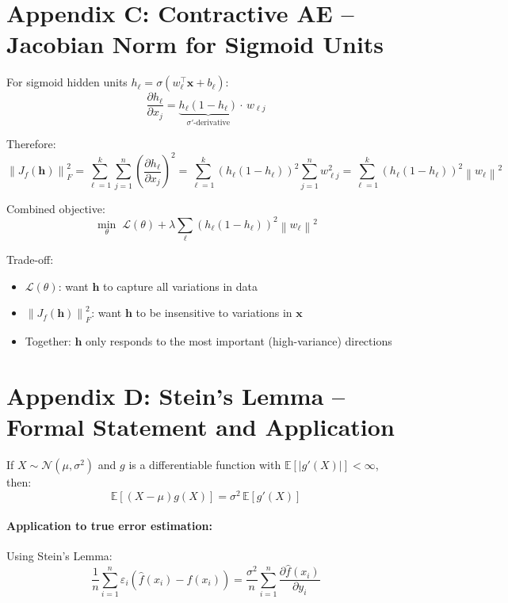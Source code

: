 \documentclass[12pt,a4paper]{article}
\newcommand{\E}{\mathbb{E}}
\newcommand{\norm}[1]{\left\|#1\right\|}
\newcommand{\vx}{\mathbf{x}}
\newcommand{\vh}{\mathbf{h}}
\newcommand{\Loss}{\mathcal{L}}
\begin{document}
\section{Appendix C: Contractive AE -- Jacobian Norm for Sigmoid Units}

For sigmoid hidden units $h_\ell = \sigma(w_\ell^\top\vx + b_\ell)$:
\[
  \frac{\partial h_\ell}{\partial x_j}
  = \underbrace{h_\ell(1-h_\ell)}_{\sigma'\text{-derivative}}
    \cdot\, w_{\ell j}
\]

Therefore:
\[
  \norm{J_f(\vh)}_F^2
  = \sum_{\ell=1}^{k}\sum_{j=1}^{n}
    \left(\frac{\partial h_\ell}{\partial x_j}\right)^2
  = \sum_{\ell=1}^{k}(h_\ell(1-h_\ell))^2\sum_{j=1}^{n}w_{\ell j}^2
  = \sum_{\ell=1}^{k}(h_\ell(1-h_\ell))^2\norm{w_\ell}^2
\]

Combined objective:
\[
  \min_\theta\;\Loss(\theta) + \lambda\sum_\ell(h_\ell(1-h_\ell))^2\norm{w_\ell}^2
\]

Trade-off:
\begin{itemize}
  \item $\Loss(\theta)$: want $\vh$ to capture all variations in data
  \item $\norm{J_f(\vh)}_F^2$: want $\vh$ to be insensitive to variations in $\vx$
  \item Together: $\vh$ only responds to the most important (high-variance) directions
\end{itemize}

\section{Appendix D: Stein's Lemma -- Formal Statement and Application}

\begin{theorembox}[title={Stein's Lemma (Formal)}]
If $X \sim \mathcal{N}(\mu, \sigma^2)$ and $g$ is a differentiable function with $\E[|g'(X)|] < \infty$, then:
\[
  \E[(X-\mu)g(X)] = \sigma^2\,\E[g'(X)]
\]
\end{theorembox}

\paragraph{Application to true error estimation:} Using Stein's Lemma:
\[
  \frac{1}{n}\sum_{i=1}^{n}\varepsilon_i(\hat{f}(x_i) - f(x_i))
  = \frac{\sigma^2}{n}\sum_{i=1}^{n}\frac{\partial\hat{f}(x_i)}{\partial y_i}
\]
\end{document}
